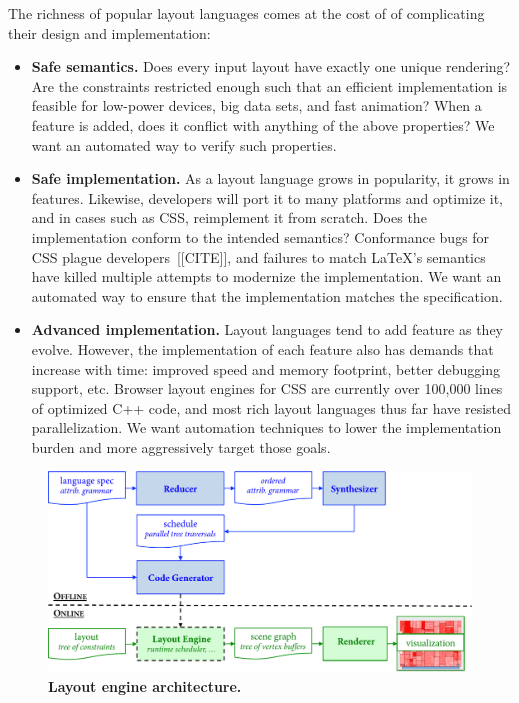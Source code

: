 The richness of popular layout languages comes at the cost of of complicating their design and implementation:

\begin{itemize}
\item \textbf{Safe semantics.} Does every input layout have exactly one unique rendering? Are the constraints restricted enough such that an efficient implementation is feasible for low-power devices, big data sets, and fast animation? When a feature is added, does it conflict with anything of the above properties? We want an automated way to verify such properties.
\item \textbf{Safe implementation.} As a layout language grows in popularity, it grows in features. Likewise, developers will port it to many platforms and optimize it, and in cases such as CSS, reimplement it from scratch. Does the implementation conform to the intended semantics? Conformance bugs for CSS plague developers~[[CITE]], and failures to match {\LaTeX}'s semantics have killed multiple attempts to modernize the implementation. We want an automated way to ensure that the implementation matches the specification.
\item \textbf{Advanced implementation.} Layout languages tend to add feature as they evolve. However, the implementation of each feature also has demands that increase with time: improved speed and memory footprint, better debugging support, etc. Browser layout engines for CSS are currently over 100,000 lines of optimized C++ code, and most rich layout languages thus far have resisted parallelization. We want automation techniques to lower the implementation burden and more aggressively target those goals.
\end{itemize}


\begin{figure}
\centering
\includegraphics[trim=0 0 0 0,clip,width=1.0\columnwidth]{chapter2/architecture}
\caption{\textbf{Layout engine architecture.} }
\label{fig:architecture}
\end{figure}

